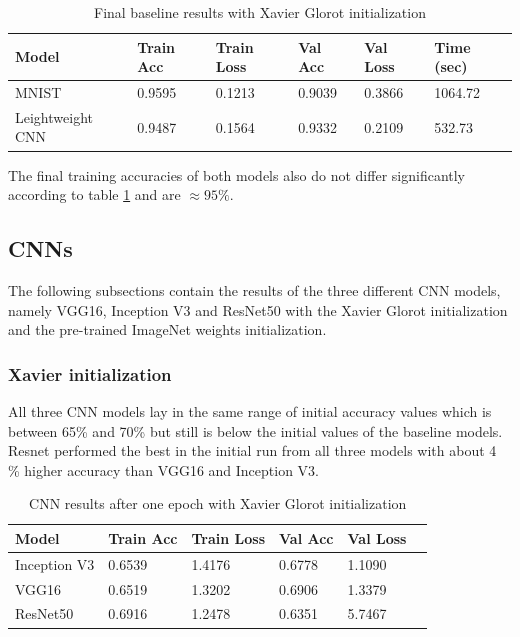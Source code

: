 \documentclass{article}
\theoremstyle{definition}
\theoremstyle{remark}
\begin{document}
\begin{table}[h!]
\center
\begin{tabular}{|l|l|l|l|l|l|}
\hline
\textbf{Model} & \textbf{Train Acc} & \textbf{Train Loss} & \textbf{Val Acc} & \textbf{Val Loss} & \textbf{Time (sec)}\\ \hline
MNIST		    & 0.9595 		 & 0.1213      & 0.9039		  & 0.3866	 &	1064.72\\ \hline
Leightweight CNN    & 0.9487   	 & 0.1564 	   & 0.9332		  &	0.2109	 &  532.73 \\ \hline
\end{tabular}
\caption{Final baseline results with Xavier Glorot initialization}
\label{tab:final_baseline_results_xavier}
\end{table}

The final training accuracies of both models also do not differ significantly according to table \ref{tab:final_baseline_results_xavier} and are $\approx 95\%$.

\newpage

\subsection{CNNs}

The following subsections contain the results of the three different CNN models, namely VGG16, Inception V3 and ResNet50 with the Xavier Glorot initialization and the pre-trained ImageNet weights initialization.


\subsubsection{Xavier initialization}

All three CNN models lay in the same range of initial accuracy values which is between 65\% and 70\% but still is below the initial values of the baseline models. Resnet performed the best in the initial run from all three models with about 4 \% higher accuracy than VGG16 and Inception V3.



\begin{table}[h!]
\center
\begin{tabular}{|l|l|l|l|l|l|}
\hline
\textbf{Model} & \textbf{Train Acc} & \textbf{Train Loss} & \textbf{Val Acc} & \textbf{Val Loss}\\ \hline
Inception V3 & 0.6539 	& 1.4176 	 &  0.6778	 & 1.1090\\ \hline
VGG16  		& 0.6519   	& 1.3202     &  0.6906	 &	1.3379\\ \hline
ResNet50  	& 0.6916  	& 1.2478 	 &  0.6351	 &	5.7467\\ \hline
\end{tabular}
\caption{CNN results after one epoch with Xavier Glorot initialization}
\label{tab:one_epoch_cnn_results_xavier}
\end{table}
\end{document}
